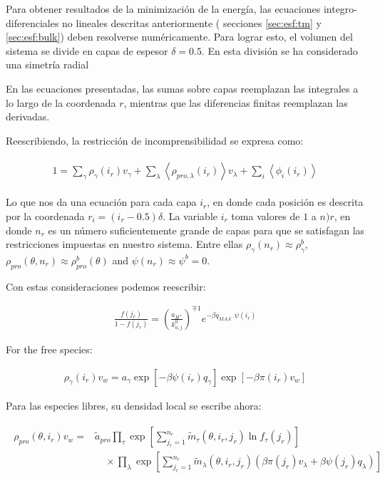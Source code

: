 Para obtener resultados de la minimizaci\'on de la energ\'ia, las ecuaciones integro-diferenciales no lineales descritas anteriormente ( secciones \ref{sec:esf:tm} y \ref{sec:esf:bulk}) deben resolverse num\'ericamente. Para lograr esto, el volumen del sistema se divide en capas de espesor $\delta = 0.5$. En esta divisi\'on se ha considerado una simetr\'ia radial 

En las ecuaciones presentadas, las sumas sobre capas reemplazan las integrales a lo largo de la coordenada $r$, mientras que las diferencias finitas reemplazan las derivadas.

Reescribiendo, la restricci\'on de incomprensibilidad se expresa como:

\begin{align}
	\begin{aligned}
		1=  {\sum_{\gamma}\rho_\gamma(i_r) v_\gamma + \sum_\lambda{\left<\rho_{pro,\lambda}(i_r)\right>v_\lambda} + \sum_i{\left<\phi_i(i_r)\right>}}
		\label{eq:esf:pi-ir}
	\end{aligned}
\end{align}

Lo que nos da una ecuaci\'on para cada capa $i_r$, en donde cada posici\'on es descrita por la coordenada $r_i = (i_r -0.5)\delta$. 
La variable $i_r$ toma valores de $1$ a $n)r$, en donde $n_r$ es un n\'umero suficientemente grande de capas para que se satisfagan las restricciones impuestas en nuestro sistema. Entre ellas
$\rho_\gamma(n_r) \approx \rho_\gamma^b$, $\rho_{pro}(\theta,n_r) \approx \rho_{pro}^b(\theta)$ and $\psi(n_r) \approx \psi^b = 0$.

Con estas consideraciones podemos reescribir:


\begin{align}
	\frac{f(j_r)}{1-f(j_r)}= \left(\frac{a_{H^+}}{k^0_{a,j}}\right)^{\mp 1} e^{-\beta q_{MAA^-}\psi(i_r)}
\end{align}


For the free species:

\begin{align}
	\rho_\gamma(i_r)v_w = a_\gamma \exp{[-\beta \psi(i_r)q_\gamma]} \exp{[-\beta\pi(i_r) v_w]}
\end{align}

Para las especies libres, su densidad local se escribe ahora:

\begin{align}
	\begin{aligned}
		\rho_{pro}(\theta, i_r)v_w = &\tilde{a}_{pro} \prod_\tau\exp\left[ \sum^{n_r}_{j_r = 1} \tilde{m}_\tau(\theta,i_r,j_r) \ln f_\tau(j_r)\right] \\
		& \hspace{1em} \times \prod_\lambda \exp \left[ \sum^{n_r}_{j_r = 1} \tilde{m}_\lambda(\theta,i_r, j_r)\left(\beta\pi(j_r) v_\lambda+ \beta \psi(j_r)q_\lambda\right) \right]
	\end{aligned}
\end{align}

